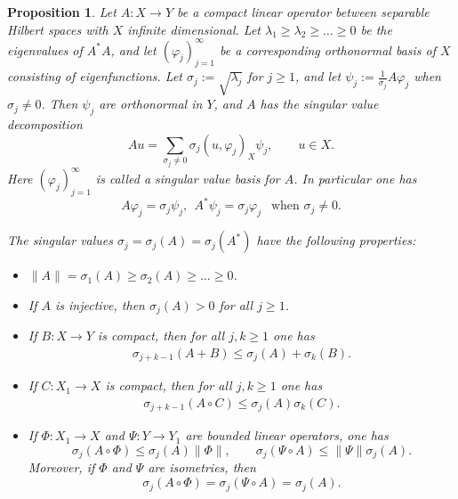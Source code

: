 \documentclass[12pt,twoside]{amsart}
\numberwithin{equation}{section}
\renewcommand{\leq}{\leqslant}
\renewcommand{\geq}{\geqslant}
\newtheorem{proposition}[theorem]{Proposition}
\newcommand{\norm}[1]{\lVert #1 \rVert}         %
\begin{document}
\begin{proposition} \label{prop_singular_value_decomposition}
Let $A: X \to Y$ be a compact linear operator between separable Hilbert spaces with $X$ infinite dimensional. Let $\lambda_1 \geq \lambda_2 \geq \ldots \geq 0$ be the eigenvalues of $A^* A$, and let $(\varphi_j)_{j=1}^{\infty}$ be a corresponding orthonormal basis of $X$ consisting of eigenfunctions. Let $\sigma_j := \sqrt{\lambda_j}$ for $j \geq 1$, and let $\psi_j := \frac{1}{\sigma_j} A \varphi_j$ when $\sigma_j \neq 0$. Then $\psi_j$ are orthonormal in $Y$, and $A$ has the singular value decomposition 
\[
Au = \sum_{\sigma_j \neq 0} \sigma_j (u, \varphi_j)_X \psi_j, \qquad u \in X.
\]
Here $(\varphi_j)_{j=1}^{\infty}$ is called a singular value basis for $A$. In particular one has 
\[
A\varphi_j = \sigma_j \psi_j, \ \  A^* \psi_j = \sigma_j \varphi_j \ \ \text{ when $\sigma_j \neq 0$}.
\]

The singular values $\sigma_j = \sigma_j(A) = \sigma_j(A^*)$ have the following properties:
\begin{itemize}
\item[(a)] $\norm{A} = \sigma_1(A) \geq \sigma_2(A)\geq \ldots \geq 0$.
\item[(b)] If $A$ is injective, then $\sigma_j(A) > 0$ for all $j \geq 1$.
\item[(c)] If $B: X \to Y$ is compact, then for all $j,k \geq 1$ one has 
\begin{align*}
\sigma_{j+k-1}(A+B) \leq \sigma_j(A) + \sigma_k(B).
\end{align*}
\item[(d)] If $C: X_1 \to X$ is compact, then for all $j,k \geq 1$ one has 
\begin{align*}
\sigma_{j+k-1}(A \circ C) \leq \sigma_j(A) \sigma_k(C).
\end{align*}
\item[(e)] If $\Phi: X_1 \to X$ and $\Psi: Y \to Y_1$ are bounded linear operators, one has 
\[
\sigma_j(A \circ \Phi) \leq \sigma_j(A) \norm{\Phi}, \qquad \sigma_j(\Psi \circ A) \leq \norm{\Psi} \sigma_j(A).
\]
Moreover, if $\Phi$ and $\Psi$ are isometries, then 
\[
\sigma_j(A \circ \Phi) = \sigma_j(\Psi \circ A) = \sigma_j(A).
\]
\end{itemize}
\end{proposition}
\end{document}
